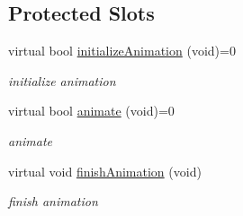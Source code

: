 \subsection*{Protected Slots}
\begin{DoxyCompactItemize}
\item 
\mbox{\label{class_transition_data_ad08f2587b9934de6b7813a57aaff2c86}} 
virtual bool \hyperlink{class_transition_data_ad08f2587b9934de6b7813a57aaff2c86}{initialize\+Animation} (void)=0
\begin{DoxyCompactList}\small\item\em initialize animation \end{DoxyCompactList}\item 
\mbox{\label{class_transition_data_a96dc852e309ef11c4341fde95c7e1814}} 
virtual bool \hyperlink{class_transition_data_a96dc852e309ef11c4341fde95c7e1814}{animate} (void)=0
\begin{DoxyCompactList}\small\item\em animate \end{DoxyCompactList}\item 
\mbox{\label{class_transition_data_a3d96686c914ec6b4dfaec3de9a075ab4}} 
virtual void \hyperlink{class_transition_data_a3d96686c914ec6b4dfaec3de9a075ab4}{finish\+Animation} (void)
\begin{DoxyCompactList}\small\item\em finish animation \end{DoxyCompactList}\end{DoxyCompactItemize}
